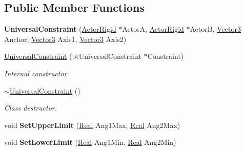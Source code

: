 \subsection*{Public Member Functions}
\begin{DoxyCompactItemize}
\item 
\hypertarget{classphys_1_1UniversalConstraint_af08d5335171393e338b0617f99855701}{
{\bfseries UniversalConstraint} (\hyperlink{classphys_1_1ActorRigid}{ActorRigid} $\ast$ActorA, \hyperlink{classphys_1_1ActorRigid}{ActorRigid} $\ast$ActorB, \hyperlink{classphys_1_1Vector3}{Vector3} Anchor, \hyperlink{classphys_1_1Vector3}{Vector3} Axis1, \hyperlink{classphys_1_1Vector3}{Vector3} Axis2)}
\label{d0/d09/classphys_1_1UniversalConstraint_af08d5335171393e338b0617f99855701}

\item 
\hyperlink{classphys_1_1UniversalConstraint_af4d0828590b7fb242f601a171aa5db5f}{UniversalConstraint} (btUniversalConstraint $\ast$Constraint)
\begin{DoxyCompactList}\small\item\em Internal constructor. \item\end{DoxyCompactList}\item 
\hyperlink{classphys_1_1UniversalConstraint_aba3078f0f19a1a66c330d96f278e6fd8}{$\sim$UniversalConstraint} ()
\begin{DoxyCompactList}\small\item\em Class destructor. \item\end{DoxyCompactList}\item 
\hypertarget{classphys_1_1UniversalConstraint_a91e521aef75d4d32f91868ba31f486da}{
void {\bfseries SetUpperLimit} (\hyperlink{namespacephys_af7eb897198d265b8e868f45240230d5f}{Real} Ang1Max, \hyperlink{namespacephys_af7eb897198d265b8e868f45240230d5f}{Real} Ang2Max)}
\label{d0/d09/classphys_1_1UniversalConstraint_a91e521aef75d4d32f91868ba31f486da}

\item 
\hypertarget{classphys_1_1UniversalConstraint_a09b51abf3370f7834c9c1c2a326c57ca}{
void {\bfseries SetLowerLimit} (\hyperlink{namespacephys_af7eb897198d265b8e868f45240230d5f}{Real} Ang1Min, \hyperlink{namespacephys_af7eb897198d265b8e868f45240230d5f}{Real} Ang2Min)}
\label{d0/d09/classphys_1_1UniversalConstraint_a09b51abf3370f7834c9c1c2a326c57ca}

\end{DoxyCompactItemize}
